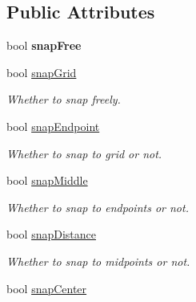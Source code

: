 \subsection*{Public Attributes}
\begin{DoxyCompactItemize}
\item 
\hypertarget{structRS__SnapMode_a3230bc87410988cde538bace80dd2b86}{bool {\bfseries snap\-Free}}\label{structRS__SnapMode_a3230bc87410988cde538bace80dd2b86}

\item 
\hypertarget{structRS__SnapMode_a7194e6193a87f1fe88bd8b03d83b606c}{bool \hyperlink{structRS__SnapMode_a7194e6193a87f1fe88bd8b03d83b606c}{snap\-Grid}}\label{structRS__SnapMode_a7194e6193a87f1fe88bd8b03d83b606c}

\begin{DoxyCompactList}\small\item\em Whether to snap freely. \end{DoxyCompactList}\item 
\hypertarget{structRS__SnapMode_ab629996c4efd367b2eef3264673cac17}{bool \hyperlink{structRS__SnapMode_ab629996c4efd367b2eef3264673cac17}{snap\-Endpoint}}\label{structRS__SnapMode_ab629996c4efd367b2eef3264673cac17}

\begin{DoxyCompactList}\small\item\em Whether to snap to grid or not. \end{DoxyCompactList}\item 
\hypertarget{structRS__SnapMode_aee8a57231200c50ba7419eda36d1ac02}{bool \hyperlink{structRS__SnapMode_aee8a57231200c50ba7419eda36d1ac02}{snap\-Middle}}\label{structRS__SnapMode_aee8a57231200c50ba7419eda36d1ac02}

\begin{DoxyCompactList}\small\item\em Whether to snap to endpoints or not. \end{DoxyCompactList}\item 
\hypertarget{structRS__SnapMode_a4766940a0b336254e0b9bc6483662030}{bool \hyperlink{structRS__SnapMode_a4766940a0b336254e0b9bc6483662030}{snap\-Distance}}\label{structRS__SnapMode_a4766940a0b336254e0b9bc6483662030}

\begin{DoxyCompactList}\small\item\em Whether to snap to midpoints or not. \end{DoxyCompactList}\item 
\hypertarget{structRS__SnapMode_acd650600c1024d685628c4d3dee97b80}{bool \hyperlink{structRS__SnapMode_acd650600c1024d685628c4d3dee97b80}{snap\-Center}}\label{structRS__SnapMode_acd650600c1024d685628c4d3dee97b80}


\end{DoxyCompactItemize}
